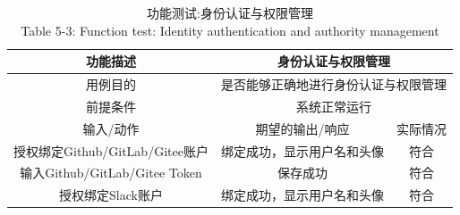\begin{table}[htbp]\center
    \caption{功能测试:身份认证与权限管理\\ Table 5-3:  Function test: Identity authentication and authority management}
    \begin{tabular}{|c|c|c|}
        \hline
        功能描述 & \multicolumn{2}{|c|}{身份认证与权限管理}\\
        \hline
        用例目的 & \multicolumn{2}{|c|}{是否能够正确地进行身份认证与权限管理}\\
        \hline
        前提条件 & \multicolumn{2}{|c|}{系统正常运行}\\
        \hline
        输入/动作 & 期望的输出/响应 & 实际情况\\
        \hline
        授权绑定Github/GitLab/Gitee账户 & 绑定成功，显示用户名和头像 & 符合 \\
        \hline
        输入Github/GitLab/Gitee Token & 保存成功 & 符合 \\
        \hline
        授权绑定Slack账户 & 绑定成功，显示用户名和头像 & 符合 \\
        \hline
    \end{tabular}
\end{table}
